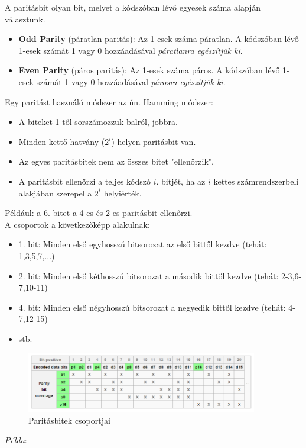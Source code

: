 \documentclass[12pt]{article}
\begin{document}
    A paritásbit olyan bit, melyet a kódszóban lévő egyesek száma alapján választunk.
    \begin{itemize}[leftmargin=7.5mm]
        \renewcommand{\labelitemi}{$\vcenter{\hbox{\tiny$\bullet$}}$}
    	\item \textbf{\small Odd Parity} (páratlan paritás): Az 1-esek száma páratlan. A kódszóban lévő 1-esek számát 1 vagy 0 hozzáadásával \emph{páratlanra egészítjük ki}.
    	\item \textbf{\small Even Parity} (páros paritás): Az 1-esek száma páros. A kódszóban lévő 1-esek számát 1 vagy 0 hozzáadásával \emph{párosra egészítjük ki}.
    \end{itemize}
    Egy paritást használó módszer az ún. Hamming módszer:
    \begin{itemize}
        \item A biteket 1-től sorszámozzuk balról, jobbra.
        \item Minden kettő-hatvány ($2^{i}$) helyen paritásbit van.
        \item Az egyes paritásbitek nem az összes bitet "ellenőrzik".
        \item A paritásbit ellenőrzi a teljes kódszó $i.$ bitjét, ha az $i$ kettes számrendszerbeli alakjában szerepel a $2^{i}$ helyiérték.\\
    \end{itemize}

    \noindent Például: a 6. bitet a 4-es és 2-es paritásbit ellenőrzi.\\

    \noindent A csoportok a következőképp alakulnak:
    \begin{itemize}[leftmargin=7.5mm]
        \renewcommand{\labelitemi}{$\vcenter{\hbox{\tiny$\bullet$}}$}
    	\item 1. bit: Minden első egyhosszú bitsorozat az első bittől kezdve (tehát: 1,3,5,7,...)
    	\item 2. bit: Minden első kéthosszú bitsorozat a második bittől kezdve (tehát: 2-3,6-7,10-11)
    	\item 4. bit: Minden első négyhosszú bitsorozat a negyedik bittől kezdve (tehát: 4-7,12-15)
    	\item stb.
    \end{itemize}
    \begin{figure}[H]
    	\centering
    	\includegraphics[width=0.9\textwidth]{img/paritasbit.png}
    	\caption{Paritásbitek csoportjai}	
    \end{figure}
    \newpage
    \noindent \emph{Példa}:\\
\end{document}
